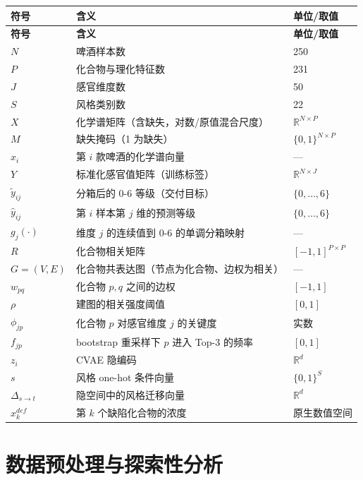 \documentclass[zihao=-4,a4paper,UTF8,fontset=none]{ctexart}
\begin{document}
{\small
\begin{longtable}{@{}p{2.4cm}p{9.1cm}p{3.4cm}@{}}
\toprule
\textbf{符号} & \textbf{含义} & \textbf{单位/取值} \\ \midrule
\endfirsthead
\toprule
\textbf{符号} & \textbf{含义} & \textbf{单位/取值} \\ \midrule
\endhead
\bottomrule
\endlastfoot
$N$ & 啤酒样本数 & 250 \\
$P$ & 化合物与理化特征数 & 231 \\
$J$ & 感官维度数 & 50 \\
$S$ & 风格类别数 & 22 \\
$X$ & 化学谱矩阵（含缺失，对数/原值混合尺度） & $\mathbb{R}^{N\times P}$ \\
$M$ & 缺失掩码（1 为缺失） & $\{0,1\}^{N\times P}$ \\
$x_i$ & 第 $i$ 款啤酒的化学谱向量 & — \\
$Y$ & 标准化感官值矩阵（训练标签） & $\mathbb{R}^{N\times J}$ \\
$\tilde y_{ij}$ & 分箱后的 0-6 等级（交付目标） & $\{0,\dots,6\}$ \\
$\hat y_{ij}$ & 第 $i$ 样本第 $j$ 维的预测等级 & $\{0,\dots,6\}$ \\
$g_j(\cdot)$ & 维度 $j$ 的连续值到 0-6 的单调分箱映射 & — \\
$R$ & 化合物相关矩阵 & $[-1,1]^{P\times P}$ \\
$G=(V,E)$ & 化合物共表达图（节点为化合物、边权为相关） & — \\
$w_{pq}$ & 化合物 $p,q$ 之间的边权 & $[-1,1]$ \\
$\rho$ & 建图的相关强度阈值 & $[0,1]$ \\
$\phi_{jp}$ & 化合物 $p$ 对感官维度 $j$ 的关键度 & 实数 \\
$f_{jp}$ & bootstrap 重采样下 $p$ 进入 Top-3 的频率 & $[0,1]$ \\
$z_i$ & CVAE 隐编码 & $\mathbb{R}^{d}$ \\
$s$ & 风格 one-hot 条件向量 & $\{0,1\}^{S}$ \\
$\Delta_{s\to t}$ & 隐空间中的风格迁移向量 & $\mathbb{R}^{d}$ \\
$x^{def}_k$ & 第 $k$ 个缺陷化合物的浓度 & 原生数值空间 \\
\end{longtable}}

\section{数据预处理与探索性分析}
\end{document}
